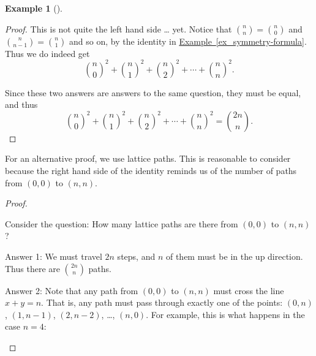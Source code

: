\documentclass[10pt,]{book}
\theoremstyle{plain}
\theoremstyle{definition}
\newtheorem{example}[theorem]{Example}
\theoremstyle{definition}
\theoremstyle{definition}
\numberwithin{equation}{chapter}
\begin{document}
\begin{example}[]
\begin{proof}
            This is not quite the left hand side \dots{} yet. Notice that \({n \choose n} = {n \choose 0}\) and \({n \choose n-1} = {n  \choose 1}\) and so on, by the identity in
            \hyperref[ex_symmetry-formula]{Example~\ref{ex_symmetry-formula}}. Thus we do indeed get
            \begin{equation*}
              {n \choose 0}^2 + {n \choose 1}^2 + {n \choose 2}^2 + \cdots + {n \choose n}^2.
            \end{equation*}
\par

            Since these two answers are answers to the same question, they must be equal, and thus
            \begin{equation*}
              {n \choose 0}^2 + {n \choose 1}^2 + {n \choose 2}^2 + \cdots + {n \choose n}^2 = {2n \choose n}.
            \end{equation*}
\end{proof}
\par

          For an alternative proof, we use lattice paths. This is reasonable to consider because the right hand side of the identity reminds us of the number of paths from \((0,0)\) to \((n,n)\).
\begin{proof}\hypertarget{proof-6}{}

            Consider the question: How many lattice paths are there from \((0,0)\) to \((n,n)\)?
\par

            Answer 1: We must travel \(2n\) steps, and \(n\) of them must be in the up direction. Thus there are \({2n \choose n}\) paths.
\par

            Answer 2: Note that any path from \((0,0)\) to \((n,n)\) must cross the line \(x + y = n\). That is, any path must pass through exactly one of the points: \((0,n)\), \((1,n-1)\), \((2,n-2)\), \dots{}, \((n, 0)\). For example, this is what happens in the case \(n = 4\):
\leavevmode%
\begin{figure}
\centering
{
}
\end{figure}
\par


\end{proof}
\end{example}
\end{document}
